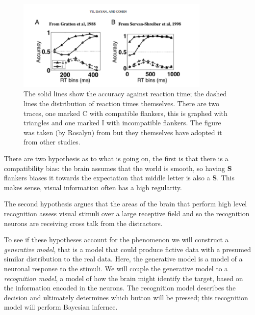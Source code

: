 \documentclass[12pt]{article}
\begin{document}
\begin{figure}[tb]
\begin{center}
  \includegraphics[width=9.5cm]{fig_rt_accurate.png}
\end{center}
\caption{The solid lines show the accuracy against reaction
  time; the dashed lines the distribution of reaction times themselves. There are two traces, one marked C with compatible flankers, this is graphed with triangles and one marked I with incompatible flankers. The figure was taken (by Rosalyn) from \cite{YuDayanCohen2009} but they themselves have adopted it from other studies. \label{fig_rt_accurate}}
\end{figure}

There are two hypothesis as to what is going on, the first is that
there is a compatibility bias: the brain assumes that the world is
smooth, so having \textbf{S} flankers biases it towards the
expectation that middle letter is also a \textbf{S}. This makes sense,
visual information often has a high regularity. 

The second hypothesis argues that the areas of the brain that perform
high level recognition assess visual stimuli over a large receptive
field and so the recognition neurons are receiving cross talk from the
distractors.

To see if these hypotheses account for the phenomenon we will
construct a \textsl{generative model}, that is a model that could
produce fictive data with a presumed similar distribution to the real
data. Here, the generative model is a model of a neuronal response to
the stimuli. We will couple the generative model to a
\textsl{recognition model}, a model of how the brain might identify
the target, based on the information encoded in the neurons. The
recognition model describes the decision and ultimately determines
which button will be pressed; this recognition model will perform
Bayesian infernce.
\end{document}
